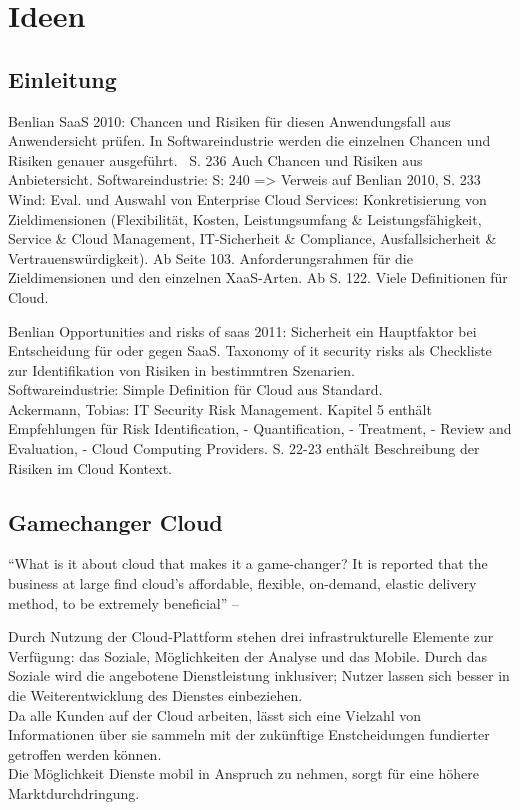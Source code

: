 \section{Ideen}
\subsection{Einleitung}
Benlian SaaS 2010: Chancen und Risiken für diesen Anwendungsfall aus Anwendersicht prüfen. In Softwareindustrie werden die einzelnen Chancen und Risiken genauer ausgeführt. ~S. 236
Auch Chancen und Risiken aus Anbietersicht. Softwareindustrie: S: 240 => Verweis auf Benlian 2010, S. 233 \\
Wind: Eval. und Auswahl von Enterprise Cloud Services: Konkretisierung von Zieldimensionen (Flexibilität, Kosten, Leistungsumfang  \& Leistungsfähigkeit, Service \& Cloud Management, IT-Sicherheit \&
Compliance, Ausfallsicherheit \& Vertrauenswürdigkeit). Ab Seite 103. Anforderungsrahmen für die Zieldimensionen und den einzelnen XaaS-Arten. Ab S. 122. Viele Definitionen für Cloud.

Benlian Opportunities and risks of saas 2011: Sicherheit ein Hauptfaktor bei Entscheidung für oder gegen SaaS. Taxonomy of it security risks als Checkliste zur Identifikation von Risiken in bestimmtren 
Szenarien. \\

Softwareindustrie: Simple Definition für Cloud aus Standard. \\

Ackermann, Tobias: IT Security Risk Management. Kapitel 5 enthält Empfehlungen für Risk Identification, - Quantification, - Treatment, - Review and Evaluation, - Cloud Computing Providers. S. 22-23 enthält
Beschreibung der Risiken im Cloud Kontext.


\subsection{Gamechanger Cloud}
"`What is it about cloud that makes it a game-changer? It
is reported that the business at large find cloud’s affordable,
flexible, on-demand, elastic delivery method, to be extremely
beneficial"' 
-- 

Durch Nutzung der Cloud-Plattform stehen drei infrastrukturelle Elemente zur 
Verfügung: das Soziale, Möglichkeiten der Analyse und das Mobile. Durch das 
Soziale wird die angebotene Dienstleistung inklusiver; Nutzer lassen sich 
besser in die Weiterentwicklung des Dienstes einbeziehen. \\
Da alle Kunden auf der Cloud arbeiten, lässt sich eine Vielzahl von 
Informationen über sie sammeln mit der zukünftige Enstcheidungen fundierter 
getroffen werden können. \\
Die Möglichkeit Dienste mobil in Anspruch zu nehmen, sorgt für eine höhere 
Marktdurchdringung. 

